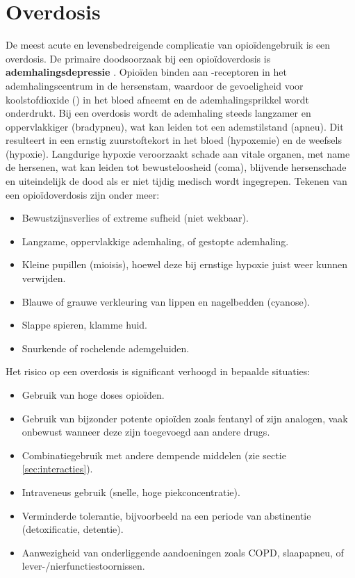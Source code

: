 \documentclass[11pt, a4paper]{report} %
\begin{document}
\section{Overdosis}
De meest acute en levensbedreigende complicatie van opioïdengebruik is een overdosis. De primaire doodsoorzaak bij een opioïdoverdosis is \textbf{ademhalingsdepressie} \parencite{WHO2023Opioid, Gupta2010ChemistryOpioids}. Opioïden binden aan \textmu-receptoren in het ademhalingscentrum in de hersenstam, waardoor de gevoeligheid voor koolstofdioxide () in het bloed afneemt en de ademhalingsprikkel wordt onderdrukt. Bij een overdosis wordt de ademhaling steeds langzamer en oppervlakkiger (bradypneu), wat kan leiden tot een ademstilstand (apneu). Dit resulteert in een ernstig zuurstoftekort in het bloed (hypoxemie) en de weefsels (hypoxie). Langdurige hypoxie veroorzaakt schade aan vitale organen, met name de hersenen, wat kan leiden tot bewusteloosheid (coma), blijvende hersenschade en uiteindelijk de dood als er niet tijdig medisch wordt ingegrepen. Tekenen van een opioïdoverdosis zijn onder meer:
\begin{itemize}
    \item Bewustzijnsverlies of extreme sufheid (niet wekbaar).
    \item Langzame, oppervlakkige ademhaling, of gestopte ademhaling.
    \item Kleine pupillen (mioisis), hoewel deze bij ernstige hypoxie juist weer kunnen verwijden.
    \item Blauwe of grauwe verkleuring van lippen en nagelbedden (cyanose).
    \item Slappe spieren, klamme huid.
    \item Snurkende of rochelende ademgeluiden.
\end{itemize}
Het risico op een overdosis is significant verhoogd in bepaalde situaties:
\begin{itemize}
    \item Gebruik van hoge doses opioïden.
    \item Gebruik van bijzonder potente opioïden zoals fentanyl of zijn analogen, vaak onbewust wanneer deze zijn toegevoegd aan andere drugs.
    \item Combinatiegebruik met andere dempende middelen (zie sectie \ref{sec:interacties}).
    \item Intraveneus gebruik (snelle, hoge piekconcentratie).
    \item Verminderde tolerantie, bijvoorbeeld na een periode van abstinentie (detoxificatie, detentie).
    \item Aanwezigheid van onderliggende aandoeningen zoals COPD, slaapapneu, of lever-/nierfunctiestoornissen.
\end{itemize}
\end{document}
